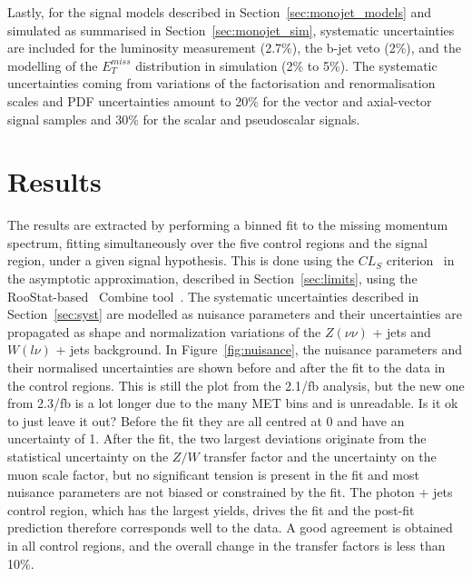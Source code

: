 Lastly, for the signal models described in Section~\ref{sec:monojet_models} and simulated as summarised in Section~\ref{sec:monojet_sim}, systematic uncertainties are included for the luminosity measurement (2.7\%), the b-jet veto (2\%), and the modelling of the $E_T^{miss}$ distribution in simulation (2\% to 5\%). The systematic uncertainties coming from variations of the factorisation and renormalisation scales and PDF uncertainties amount to 20\% for the vector and axial-vector signal samples and 30\% for the scalar and pseudoscalar signals.

\section{Results}
\label{sec:results}

The results are extracted by performing a binned fit to the missing momentum spectrum, fitting simultaneously over the five control regions and the signal region, under a given signal hypothesis. This is done using the $CL_S$ criterion~\cite{CLS1,CLS2} in the asymptotic approximation, described in Section~\ref{sec:limits}, using the RooStat-based~\cite{Moneta:2010pm} Combine tool~\cite{combine}. The systematic uncertainties described in Section~\ref{sec:syst} are modelled as nuisance parameters and their uncertainties are propagated as shape and normalization variations of the $Z(\nu\nu)$ + jets and $W(l\nu)$ + jets background. In Figure~\ref{fig:nuisance}, the nuisance parameters and their normalised uncertainties are shown before and after the fit to the data in the control regions. {\color{red} This is still the plot from the 2.1/fb analysis, but the new one from 2.3/fb is a lot longer due to the many MET bins and is unreadable. Is it ok to just leave it out?} Before the fit they are all centred at 0 and have an uncertainty of 1. After the fit, the two largest deviations originate from the statistical uncertainty on the $Z/W$ transfer factor and the uncertainty on the muon scale factor, but no significant tension is present in the fit and most nuisance parameters are not biased or constrained by the fit.
The photon + jets control region, which has the largest yields, drives the fit and the post-fit prediction therefore corresponds well to the data. A good agreement is obtained in all control regions, and the overall change in the transfer factors is less than 10\%.

